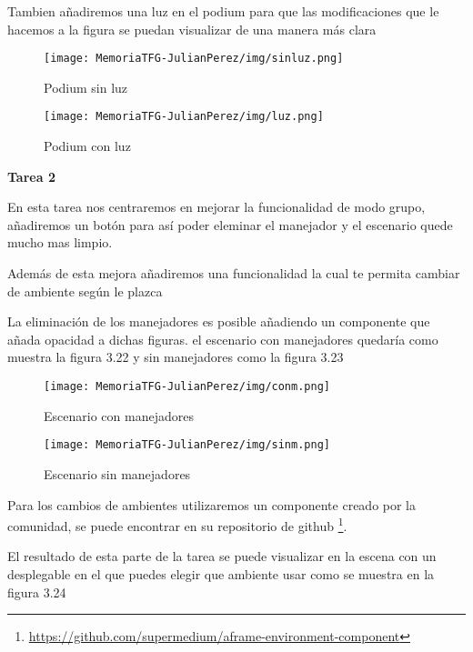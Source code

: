 \documentclass[a4paper, 12pt]{book}
\begin{document}
Tambien añadiremos una luz en el podium para que las modificaciones que le hacemos a la figura se puedan visualizar de una manera más clara

\begin{figure}[H]
  \centering
  \begin{minipage}[b]{0.4\textwidth}
 \texttt{[image: MemoriaTFG-JulianPerez/img/sinluz.png]}
  \caption{Podium sin luz}\label{single}
  \end{minipage}
  \hfill
  \begin{minipage}[b]{0.4\textwidth}
  \texttt{[image: MemoriaTFG-JulianPerez/img/luz.png]}
  \caption{Podium con luz}\label{scrum}
  \end{minipage}
\end{figure}

\textbf{Tarea 2}

En esta tarea nos centraremos en mejorar la funcionalidad de modo grupo, añadiremos un botón para así poder eleminar el manejador y el escenario quede mucho mas limpio.

Además de esta mejora añadiremos una funcionalidad la cual te permita cambiar de ambiente según le plazca 

La eliminación de los manejadores es posible añadiendo un componente que añada opacidad a dichas figuras. el escenario con manejadores quedaría como muestra la figura 3.22 y sin manejadores como la figura 3.23

\begin{figure}[H]
  \centering
  \begin{minipage}[b]{0.4\textwidth}
 \texttt{[image: MemoriaTFG-JulianPerez/img/conm.png]}
  \caption{Escenario con manejadores}\label{single}
  \end{minipage}
  \hfill
  \begin{minipage}[b]{0.4\textwidth}
  \texttt{[image: MemoriaTFG-JulianPerez/img/sinm.png]}
  \caption{Escenario sin manejadores}\label{scrum}
  \end{minipage}
\end{figure}

Para los cambios de ambientes utilizaremos un componente creado por la comunidad, se puede encontrar en su repositorio de github \footnote{\url{https://github.com/supermedium/aframe-environment-component}}. 

El resultado de esta parte de la tarea se puede visualizar en la escena con un desplegable en el que puedes elegir que ambiente usar como se muestra en la figura 3.24
\end{document}

